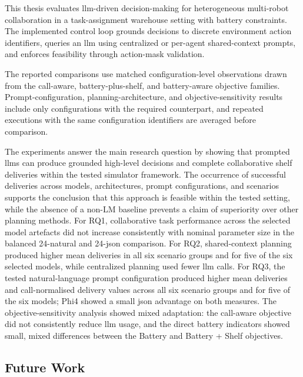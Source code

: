 This thesis evaluates \gls{llm}-driven decision-making for heterogeneous multi-robot collaboration in a task-assignment warehouse setting with battery constraints.
The implemented control loop grounds decisions to discrete environment action identifiers, queries an \gls{llm} using centralized or per-agent shared-context prompts, and enforces feasibility through action-mask validation.

The reported comparisons use matched configuration-level observations drawn from the call-aware, battery-plus-shelf, and battery-aware objective families. Prompt-configuration, planning-architecture, and objective-sensitivity results include only configurations with the required counterpart, and repeated executions with the same configuration identifiers are averaged before comparison.

The experiments answer the main research question by showing that prompted \glspl{llm} can produce grounded high-level decisions and complete collaborative shelf deliveries within the tested simulator framework. The occurrence of successful deliveries across models, architectures, prompt configurations, and scenarios supports the conclusion that this approach is feasible within the tested setting, while the absence of a non-LM baseline prevents a claim of superiority over other planning methods. For RQ1, collaborative task performance across the selected model artefacts did not increase consistently with nominal parameter size in the balanced 24-natural and 24-\gls{json} comparison. For RQ2, shared-context planning produced higher mean deliveries in all six scenario groups and for five of the six selected models, while centralized planning used fewer \gls{llm} calls. For RQ3, the tested natural-language prompt configuration produced higher mean deliveries and call-normalised delivery values across all six scenario groups and for five of the six models; Phi4 showed a small \gls{json} advantage on both measures. The objective-sensitivity analysis showed mixed adaptation: the call-aware objective did not consistently reduce \gls{llm} usage, and the direct battery indicators showed small, mixed differences between the Battery and Battery + Shelf objectives.

\subsection{Future Work}
\label{sec:futurework}

